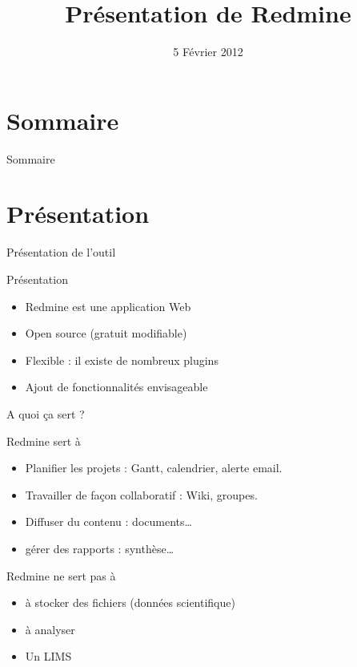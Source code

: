 \documentclass{beamer}
\title[Redmine]{Présentation de Redmine}
\institute{Plateforme de Bioinformatique de Nantes}
\date{5 Février 2012}
\begin{document}
\begin{frame}
	\titlepage
\end{frame}


\section*{Sommaire}
\begin{frame}{Sommaire}
		\small \tableofcontents[hideothersubsections]
\end{frame}

\section[Présentation]{Présentation }
\begin{frame}{Présentation de l'outil}
	\begin{block}{Présentation}
		\begin{itemize}
			\item Redmine est une application Web
			\item Open source (gratuit modifiable)
			\item Flexible : il existe de nombreux plugins
			\item Ajout de fonctionnalités envisageable
		\end{itemize}
	\end{block}

\end{frame}
\begin{frame}{A quoi ça sert ?}
	\begin{block}{Redmine sert à }
		\begin{itemize}
			\item Planifier les projets : Gantt, calendrier, alerte email. 
			\item Travailler de façon collaboratif : Wiki, groupes.
			\item Diffuser du contenu : documents\ldots 
			\item gérer des rapports : synthèse\ldots
		\end{itemize}
	\end{block}
	\begin{alertblock}{Redmine ne sert pas à}
		\begin{itemize}
			 \item à stocker des fichiers (données scientifique)
			 \item à analyser 
			 \item Un LIMS
		\end{itemize}
	\end{alertblock}
\end{frame}
\end{document}
